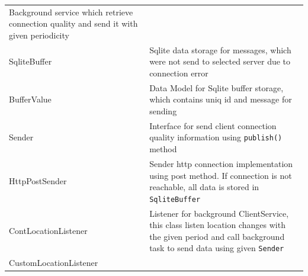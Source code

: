 \begin{longtable}[]{@{}ll@{}}
\begin{minipage}[t]{0.47\columnwidth}
Background service which retrieve connection quality and send it with
given periodicity\strut
\end{minipage}\tabularnewline
\begin{minipage}[t]{0.47\columnwidth}\raggedright
SqliteBuffer\strut
\end{minipage} & \begin{minipage}[t]{0.47\columnwidth}\raggedright
Sqlite data storage for messages, which were not send to selected server
due to connection error\strut
\end{minipage}\tabularnewline
\begin{minipage}[t]{0.47\columnwidth}\raggedright
BufferValue\strut
\end{minipage} & \begin{minipage}[t]{0.47\columnwidth}\raggedright
Data Model for Sqlite buffer storage, which contains uniq id and message
for sending\strut
\end{minipage}\tabularnewline
\begin{minipage}[t]{0.47\columnwidth}\raggedright
Sender\strut
\end{minipage} & \begin{minipage}[t]{0.47\columnwidth}\raggedright
Interface for send client connection quality information using
\texttt{publish()} method\strut
\end{minipage}\tabularnewline
\begin{minipage}[t]{0.47\columnwidth}\raggedright
HttpPostSender\strut
\end{minipage} & \begin{minipage}[t]{0.47\columnwidth}\raggedright
Sender http connection implementation using post method. If connection
is not reachable, all data is stored in \texttt{SqliteBuffer}\strut
\end{minipage}\tabularnewline
\begin{minipage}[t]{0.47\columnwidth}\raggedright
ContLocationListener\strut
\end{minipage} & \begin{minipage}[t]{0.47\columnwidth}\raggedright
Listener for background ClientService, this class listen location
changes with the given period and call background task to send data
using given \texttt{Sender}\strut
\end{minipage}\tabularnewline
\begin{minipage}[t]{0.47\columnwidth}\raggedright
CustomLocationListener\strut
\end{minipage} & \begin{minipage}[t]{0.47\columnwidth}\raggedright

\end{minipage}
\end{longtable}
